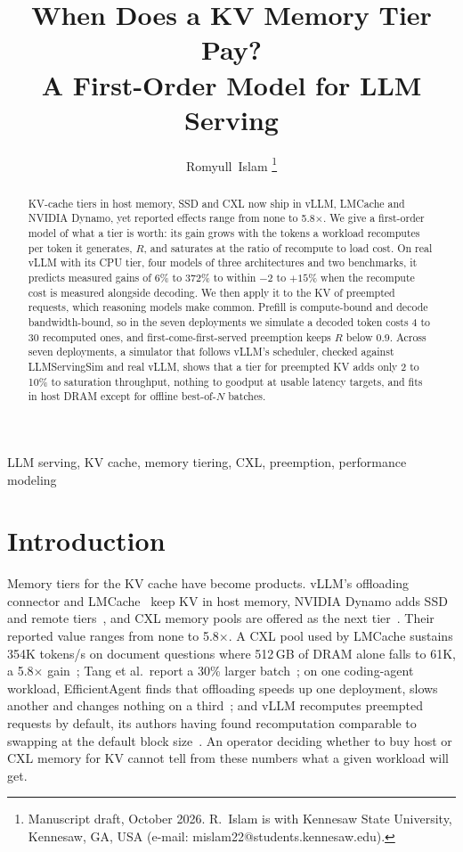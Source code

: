 \documentclass[journal]{IEEEtran}
\begin{document}
\title{When Does a KV Memory Tier Pay?\\A First-Order Model for LLM Serving}

\author{Romyull~Islam
\thanks{Manuscript draft, October 2026. R.~Islam is with Kennesaw State University, Kennesaw, GA,
USA (e-mail: mislam22@students.kennesaw.edu).}}%
\maketitle

\begin{abstract}
KV-cache tiers in host memory, SSD and CXL now ship in vLLM, LMCache and NVIDIA Dynamo, yet
reported effects range from none to 5.8$\times$. We give a first-order model of what a tier is
worth: its gain grows with the tokens a workload recomputes per token it generates, $R$, and
saturates at the ratio of recompute to load cost. On real vLLM with its CPU tier, four models of three architectures and two benchmarks, it predicts
measured gains of 6\% to 372\% to within $-2$ to $+15\%$ when the recompute cost is measured
alongside decoding. We then apply it to the KV of preempted requests,
which reasoning models make common. Prefill is compute-bound and decode bandwidth-bound, so in the
seven deployments we simulate a decoded token costs 4 to 30 recomputed ones, and first-come-first-served preemption keeps $R$ below
0.9. Across seven deployments, a simulator that follows vLLM's scheduler, checked against
LLMServingSim and real vLLM, shows that a tier for preempted KV adds only 2 to 10\% to saturation
throughput, nothing to goodput at usable latency targets, and fits in host DRAM except for offline
best-of-$N$ batches.
\end{abstract}

\begin{IEEEkeywords}
LLM serving, KV cache, memory tiering, CXL, preemption, performance modeling
\end{IEEEkeywords}

\section{Introduction}
Memory tiers for the KV cache have become products. vLLM's offloading connector and
LMCache~\cite{lmcache} keep KV in host memory, NVIDIA Dynamo adds SSD and remote
tiers~\cite{dynamo_kvbm}, and CXL memory pools are offered as the next
tier~\cite{samsung_cmmd,tang_cxl}. Their reported value ranges from none to 5.8$\times$. A CXL pool
used by LMCache sustains 354K tokens/s on document questions where 512\,GB of DRAM alone falls to
61K, a 5.8$\times$ gain~\cite{samsung_cmmd}; Tang et al.\ report a 30\% larger
batch~\cite{tang_cxl}; on one coding-agent workload, EfficientAgent finds that offloading speeds up one deployment, slows
another and changes nothing on a third~\cite{efficientagent}; and
vLLM recomputes preempted requests by default, its authors having found recomputation comparable to
swapping at the default block size~\cite{vllm}. An operator deciding whether to buy host or CXL
memory for KV cannot tell from these numbers what a given workload will get.
\end{document}
